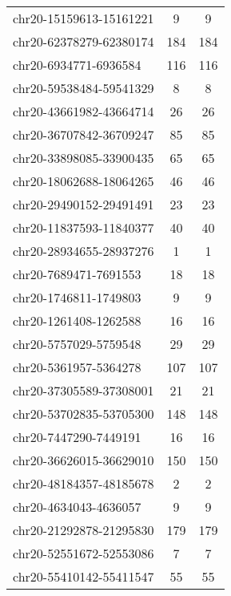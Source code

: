 \begin{longtable}{lSS}
	chr20-15159613-15161221 & 9      & 9                           \\
	chr20-62378279-62380174 & 184    & 184                         \\
	chr20-6934771-6936584   & 116    & 116                         \\
	chr20-59538484-59541329 & 8      & 8                           \\
	chr20-43661982-43664714 & 26     & 26                          \\
	chr20-36707842-36709247 & 85     & 85                          \\
	chr20-33898085-33900435 & 65     & 65                          \\
	chr20-18062688-18064265 & 46     & 46                          \\
	chr20-29490152-29491491 & 23     & 23                          \\
	chr20-11837593-11840377 & 40     & 40                          \\
	chr20-28934655-28937276 & 1      & 1                           \\
	chr20-7689471-7691553   & 18     & 18                          \\
	chr20-1746811-1749803   & 9      & 9                           \\
	chr20-1261408-1262588   & 16     & 16                          \\
	chr20-5757029-5759548   & 29     & 29                          \\
	chr20-5361957-5364278   & 107    & 107                         \\
	chr20-37305589-37308001 & 21     & 21                          \\
	chr20-53702835-53705300 & 148    & 148                         \\
	chr20-7447290-7449191   & 16     & 16                          \\
	chr20-36626015-36629010 & 150    & 150                         \\
	chr20-48184357-48185678 & 2      & 2                           \\
	chr20-4634043-4636057   & 9      & 9                           \\
	chr20-21292878-21295830 & 179    & 179                         \\
	chr20-52551672-52553086 & 7      & 7                           \\
	chr20-55410142-55411547 & 55     & 55                          \\

\end{longtable}
